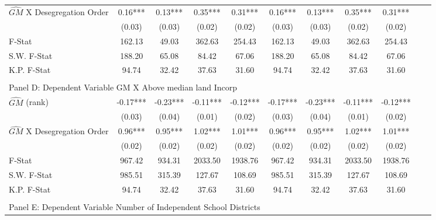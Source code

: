 \begin{table}[htbp]
\begin{threeparttable}
\begin{tabular}{l*{10}{c}}
\addlinespace
$\hat{GM}$ X Desegregation Order&       0.16***&       0.13***&       0.35***&       0.31***&       0.16***&       0.13***&       0.35***&       0.31***\\
                &     (0.03)   &     (0.03)   &     (0.02)   &     (0.02)   &     (0.03)   &     (0.03)   &     (0.02)   &     (0.02)   \\
\midrule
F-Stat          &     162.13   &      49.03   &     362.63   &     254.43   &     162.13   &      49.03   &     362.63   &     254.43   \\
S.W. F-Stat     &     188.20   &      65.08   &      84.42   &      67.06   &     188.20   &      65.08   &      84.42   &      67.06   \\
K.P. F-Stat     &      94.74   &      32.42   &      37.63   &      31.60   &      94.74   &      32.42   &      37.63   &      31.60   \\
\cmidrule[\heavyrulewidth](lr){1-9} \\ \cmidrule[\heavyrulewidth](lr){1-9}
\multicolumn{8}{l}{Panel D: Dependent Variable GM X Above median land Incorp}\\
\cmidrule(lr){1-9}
$\hat{GM}$ (rank)&      -0.17***&      -0.23***&      -0.11***&      -0.12***&      -0.17***&      -0.23***&      -0.11***&      -0.12***\\
                &     (0.03)   &     (0.04)   &     (0.01)   &     (0.02)   &     (0.03)   &     (0.04)   &     (0.01)   &     (0.02)   \\
\addlinespace
$\hat{GM}$ X Desegregation Order&       0.96***&       0.95***&       1.02***&       1.01***&       0.96***&       0.95***&       1.02***&       1.01***\\
                &     (0.02)   &     (0.02)   &     (0.02)   &     (0.02)   &     (0.02)   &     (0.02)   &     (0.02)   &     (0.02)   \\
\midrule
F-Stat          &     967.42   &     934.31   &    2033.50   &    1938.76   &     967.42   &     934.31   &    2033.50   &    1938.76   \\
S.W. F-Stat     &     985.51   &     315.39   &     127.67   &     108.69   &     985.51   &     315.39   &     127.67   &     108.69   \\
K.P. F-Stat     &      94.74   &      32.42   &      37.63   &      31.60   &      94.74   &      32.42   &      37.63   &      31.60   \\
\cmidrule[\heavyrulewidth](lr){1-9} \\ \cmidrule[\heavyrulewidth](lr){1-9}
\multicolumn{8}{l}{Panel E: Dependent Variable Number of Independent School Districts}\\

\end{tabular}
\end{threeparttable}
\end{table}
